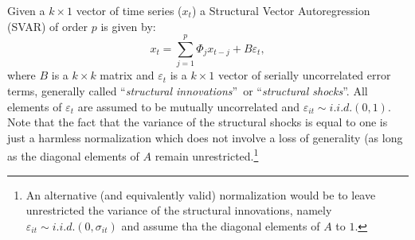 \documentclass[10pt]{article}
\begin{document}
Given a $k\times 1$ vector of time series ($x_{t}$) a Structural Vector
Autoregression (SVAR) of order $p$ is given by:%
\begin{equation}
x_{t}=\sum_{j=1}^{p}\Phi _{j}x_{t-j}+B\varepsilon _{t},
\label{eq:struct_var}
\end{equation}%
where $B$ is a $k\times k$ matrix and $\varepsilon _{t}$ is a $k\times 1$
vector of serially uncorrelated error terms, generally called
\textquotedblleft \emph{structural innovations}\textquotedblright\ or
\textquotedblleft \emph{structural shocks}\textquotedblright . All elements
of $\varepsilon _{t}$ are assumed to be mutually uncorrelated and $%
\varepsilon _{it}\sim i.i.d.(0,1)$. Note that the fact that the variance of
the structural shocks is equal to one is just a harmless normalization which
does not involve a loss of generality (as long as the diagonal elements of $A
$ remain unrestricted.\footnote{%
An alternative (and equivalently valid) normalization would be to leave
unrestricted the variance of the structural innovations, namely $\varepsilon
_{it}\sim i.i.d.(0,\sigma _{it})$ and assume tha the diagonal elements of $A$
to $1$.}
\end{document}
